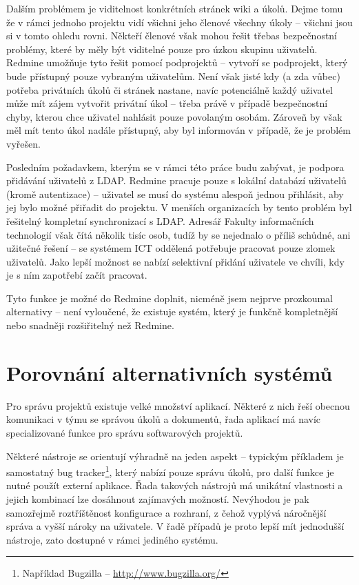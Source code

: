 \documentclass[thesis=B,czech]{FITthesis}[2012/05/02]
\begin{document}
Dalším problémem je viditelnost konkrétních stránek wiki a úkolů. Dejme
tomu že v rámci jednoho projektu vidí všichni jeho členové všechny
úkoly -- všichni jsou si v tomto ohledu rovni. Někteří
členové však mohou řešit třebas bezpečnostní problémy,
které by měly být viditelné pouze pro úzkou skupinu uživatelů. Redmine
umožňuje tyto  řešit pomocí podprojektů --
vytvoří se podprojekt, který bude přístupný pouze vybraným uživatelům.
Není však jisté kdy (a zda vůbec) potřeba privátních úkolů či stránek
nastane, navíc potenciálně každý uživatel může mít zájem vytvořit
privátní úkol -- třeba právě v případě bezpečnostní chyby, kterou chce
uživatel nahlásit pouze povolaným osobám. Zároveň by však měl mít tento
úkol nadále přístupný, aby byl informován v případě, že je problém
vyřešen.

Posledním požadavkem, kterým se v rámci této práce budu zabývat, je
podpora přidávání uživatelů z \gls{LDAP}. Redmine
pracuje pouze s lokální databází uživatelů (kromě autentizace) -- uživatel se musí do
systému alespoň jednou přihlásit, aby jej bylo možné přiřadit do
projektu. V menších organizacích by tento problém byl řešitelný
kompletní synchronizací s \gls{LDAP}. Adresář Fakulty informačních
technologií však čítá několik tisíc osob, tudíž by se nejednalo o příliš
schůdné, ani užitečné řešení -- se systémem ICT oddělená potřebuje
pracovat pouze zlomek uživatelů. Jako lepší možnost se nabízí selektivní
přidání uživatele ve chvíli, kdy je s ním zapotřebí začít pracovat.

Tyto funkce je možné do Redmine doplnit, nicméně jsem nejprve prozkoumal
alternativy -- není vyloučené, že existuje systém, který je funkčně
kompletnější nebo snadněji rozšiřitelný než Redmine.

\chapter{Porovnání alternativních systémů}

Pro správu projektů existuje velké množství aplikací. Některé z nich
řeší obecnou komunikaci v týmu se správou úkolů a dokumentů, řada
aplikací má navíc specializované funkce pro správu softwarových
projektů.

Některé nástroje se orientují výhradně na jeden aspekt -- typickým
příkladem je samostatný \gls{bug tracker}\footnote{Například Bugzilla --
  \url{http://www.bugzilla.org/}}, který nabízí pouze správu úkolů, pro
další funkce je nutné použít externí aplikace. Řada takových nástrojů má
unikátní vlastnosti a jejich kombinací lze dosáhnout zajímavých
možností. Nevýhodou je pak samozřejmě roztříštěnost konfigurace a
rozhraní, z čehož vyplývá náročnější správa a vyšší nároky na uživatele.
V řadě případů je proto lepší mít jednodušší nástroje, zato dostupné
v rámci jediného systému.
\end{document}
